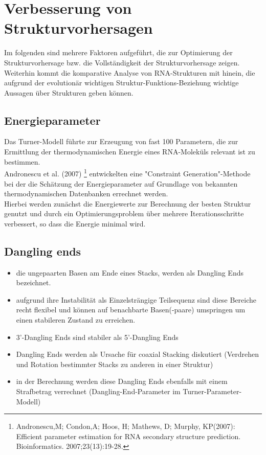 \section{Verbesserung von Strukturvorhersagen}
Im folgenden sind mehrere Faktoren aufgeführt, die zur Optimierung der Strukturvorhersage bzw. die Vollständigkeit der Strukturvorhersage zeigen. Weiterhin kommt die komparative Analyse von RNA-Strukturen mit hinein, die aufgrund der evolutionär wichtigen Struktur-Funktions-Beziehung wichtige Aussagen über Strukturen geben können. 

\subsection{Energieparameter}
Das Turner-Modell führte zur Erzeugung von fast 100 Parametern, die zur Ermittlung der thermodynamischen Energie eines RNA-Moleküls relevant ist zu bestimmen. \\
Andronescu et al. (2007) \footnote{Andronescu,M; Condon,A; Hoos, H; Mathews, D; Murphy, KP(2007): Efficient parameter estimation for RNA secondary structure prediction. Bioinformatics. 2007;23(13):19-28.} entwickelten eine "Constraint Generation"-Methode bei der die Schätzung der Energieparameter auf Grundlage von bekannten thermodynamischen Datenbanken errechnet werden. \\
Hierbei werden zunächst die Energiewerte zur Berechnung der besten Struktur genutzt und durch ein Optimierungsproblem über mehrere Iterationsschritte verbessert, so dass die Energie minimal wird.

\subsection{Dangling ends}
\begin{itemize}
\item die ungepaarten Basen am Ende eines Stacks, werden als Dangling Ends bezeichnet.
\item aufgrund ihre Instabilität als Einzelsträngige Teilsequenz sind diese Bereiche recht flexibel und können auf benachbarte Basen(-paare) umspringen um einen stabileren Zustand zu erreichen.
\item 3'-Dangling Ends sind stabiler als 5'-Dangling Ends
\item Dangling Ends werden als Ursache für coaxial Stacking diskutiert (Verdrehen und Rotation bestimmter Stacks zu anderen in einer Struktur)
\item in der Berechnung werden diese Dangling Ends ebenfalls mit einem Strafbetrag verrechnet (Dangling-End-Parameter im Turner-Parameter-Modell)
\end{itemize}

